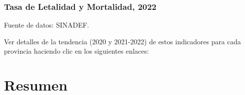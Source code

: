 \documentclass[xcolor=table]{beamer}
\begin{document}
	
	\begin{frame}[label=indicadores_provinciales]
		\frametitle{Tasa de Letalidad y Mortalidad, 2022}
		\vspace{-.5cm}
		
		\begin{table}[]
			\resizebox{\textwidth}{!}{%
				
			}
		\end{table}
		{\tiny Fuente de datos: SINADEF. \hyperlink{indice}{} \\} 
		
		Ver detalles de la tendencia (2020 y 2021-2022) de estos indicadores para cada provincia haciendo clic en los siguientes enlaces:\\ \hyperlink{Acomayo}{} \hyperlink{Anta}{} \hyperlink{Calca}{} \hyperlink{Canas}{} \hyperlink{Chumbivilcas}{}
		\hyperlink{Canchis}{} \hyperlink{Cusco}{}
		\hyperlink{Espinar}{}
		\hyperlink{laconvencion}{}
		\hyperlink{Paruro}{} \hyperlink{Paucartambo}{}
		\hyperlink{Quispicanchi}{}
		\hyperlink{Urubamba}{}
	\end{frame}

\section{Resumen }
\end{document}
